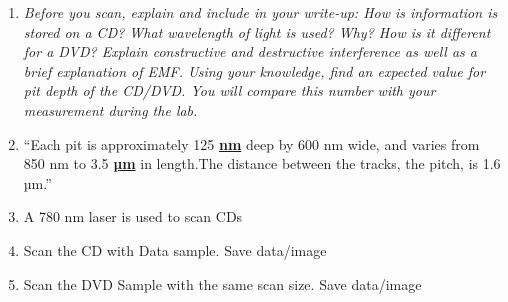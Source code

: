 \documentclass{../lab}
\begin{document}
{\begin{enumerate}
    \begin{itemize}
        \item \href{https://en.wikipedia.org/wiki/Compact\_disc}{\textbf{https://en.wikipedia.org/wiki/Compact\_disc}}

        \item \href{https://www.youtube.com/watch?v=OjSfl9IsGds}{\textbf{https://www.youtube.com/watch?v=OjSfl9IsGds}}

        \item ​\href{https://www.st-andrews.ac.uk/~www\_pa/Scots\_Guide/info/signals/bits\_cd/bits\_cd.htm}{\textbf{https://www.st-andrews.ac.uk/~www\_pa/Scots\_Guide/info/signals/bits\_cd/bits\_cd.htm}}

        \item \href{http://www.scientificamerican.com/article/how-do-rewriteable-cds-wo/}{\textbf{http://www.scientificamerican.com/article/how-do-rewriteable-cds-wo/}}

        \item encoding: \href{https://en.wikipedia.org/wiki/Eight-to-fourteen\_modulation}{\textbf{https://en.wikipedia.org/wiki/Eight-to-fourteen\_modulation}}

    \end{itemize}

    \item \emph{Before you scan, explain and include in your write-up: How is information is stored on a CD? What wavelength of light is used? Why? How is it different for a DVD? Explain constructive and destructive interference as well as a brief explanation of EMF. Using your knowledge, find an expected value for pit depth of the CD/DVD. You will compare this number with your measurement during the lab. }

    \item ``Each pit is approximately 125 \href{https://en.wikipedia.org/wiki/Nanometre}{\textbf{nm}} deep by 600 nm wide, and varies from 850 nm to 3.5 \href{https://en.wikipedia.org/wiki/Micrometre}{\textbf{µm}} in length.The distance between the tracks, the pitch, is 1.6 µm.''

    \item A 780 nm laser is used to scan CDs

    \item Scan the CD with Data sample. Save data/image

    \item Scan the DVD Sample with the same scan size.  Save data/image


\end{enumerate}}
\end{document}
